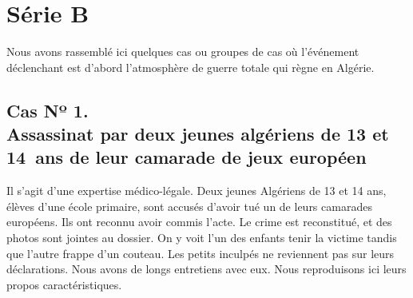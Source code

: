 \documentclass[french,twoside]{book} %
\def\mednobreak{\ifdim\lastskip<\medskipamount
  \removelastskip\nopagebreak\medskip\fi}
\newcommand{\labelblock}[1]{\medbreak{\noindent\color{rubric}\bfseries #1}\par\mednobreak}
\begin{document}
 \section[{Série B}]{Série B}
\noindent Nous avons rassemblé ici quelques cas ou groupes de cas où l’événement déclenchant est d’abord l’atmosphère de guerre totale qui règne en Algérie.\par
\subsection[{Cas Nº 1. Assassinat par deux jeunes algériens de 13 et 14 ans de leur camarade de jeux européen}]{Cas Nº 1. \\
Assassinat par deux jeunes algériens de 13 et 14 ans de leur camarade de jeux européen}
\bigbreak
\noindent Il s’agit d’une expertise médico-légale. Deux jeunes Algériens de 13 et 14 ans, élèves d’une école primaire, sont accusés d’avoir tué un de leurs camarades européens. Ils ont reconnu avoir commis l’acte. Le crime est reconstitué, et des photos sont jointes au dossier. On y voit l’un des enfants tenir la victime tandis que l’autre frappe d’un couteau. Les petits inculpés ne reviennent pas sur leurs déclarations. Nous avons de longs entretiens avec eux. Nous reproduisons ici leurs propos caractéristiques.\par

\labelblock{a) Celui de 13 ans.}
\end{document}
